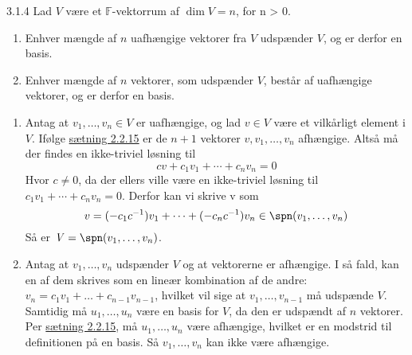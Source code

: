 \begin{saetning}{3.1.4}
	Lad $\mathit{V}$ være et $\mathbb{F}$-vektorrum af $\dim\mathit{V} = n$,
	for n > 0.

	\begin{enumerate}
		\itemsep -0.1em
		\item Enhver mængde af $n$ uafhængige vektorer fra $\mathit{V}$ 
			udspænder $\mathit{V}$, og er derfor en basis.
		\item Enhver mængde af $n$ vektorer, som udspænder $\mathit{V}$, består
			af uafhængige vektorer, og er derfor en basis.
	\end{enumerate}
\end{saetning}

\begin{bevis}
	\begin{enumerate}
		\item Antag at $v_1, \ldots, v_n \in \mathit{V}$ er uafhængige, og lad
			$v \in \mathit{V}$ være et vilkårligt element i $\mathit{V}$.
			Ifølge \hyperlink{2.2.15}{sætning 2.2.15} er de $n + 1$ 
			vektorer $v, v_1, \ldots, v_n$ afhængige. Altså må der findes en
			ikke-triviel løsning til \[cv + c_1v_1 + \cdots + c_nv_n = 0\]
			Hvor $c \ne 0$, da der ellers ville være en ikke-triviel løsning
			til $c_1v_1 + \cdots + c_nv_n = 0$.
			Derfor kan vi skrive v som
			\[v = (-c_1c^{-1})v_1 + \cdots + (-c_nc^{-1})v_n \in \spn(v_1,
			\ldots, v_n)\]
			Så er $\mathit{V} = \spn(v_1, \ldots, v_n)$.
		\item Antag at $v_1, \ldots, v_n$ udspænder $\mathit{V}$ og at
			vektorerne er afhængige.  I så fald, kan en af dem skrives som en
			lineær kombination af de andre: $v_n = c_1v_1 + \ldots +
			c_{n-1}v_{n-1}$, hvilket vil sige at $v_1, \ldots, v_{n-1}$ må
			udspænde $\textit{V}$.  Samtidig må $u_1, \ldots, u_n$ være en
			basis for $\mathit{V}$, da den er udspændt af $n$ vektorer. Per
			\hyperlink{2.2.15}{sætning 2.2.15}, må $u_1, \ldots, u_n$ være afhængige, hvilket
			er en modstrid til definitionen på en basis. Så $v_1, \ldots, v_n$
			kan ikke være afhængige.
	\end{enumerate}
\end{bevis}
